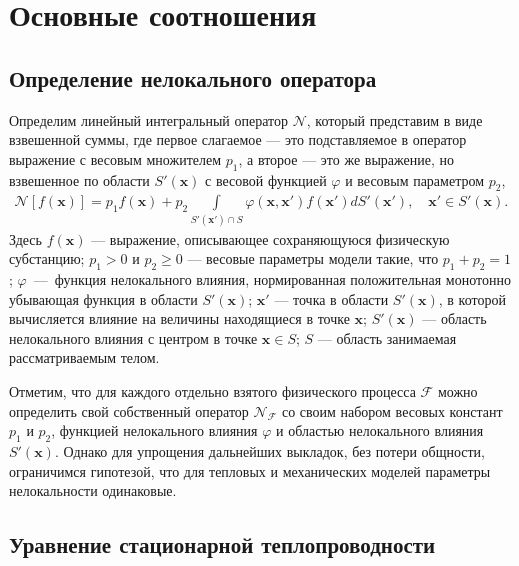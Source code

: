\chapter{Основные соотношения}\label{ch:BasicRelations} 

\section{Определение нелокального оператора}\label{sec:BasicRelations/NonlocalOperator}

Определим линейный интегральный оператор $\mathcal{N}$, который представим в виде взвешенной суммы, где первое слагаемое --- это подставляемое в оператор выражение с весовым множителем $p_1$, а второе --- это же выражение, но взвешенное по области $S'(\boldsymbol{x})$ с весовой функцией $\varphi$ и весовым параметром $p_2$,
\begin{gather}
	\label{eq:IntegroDiffOperator}
	\mathcal{N} [f(\boldsymbol{x})] = 
	p_1 f(\boldsymbol{x}) + 
	p_2 \int\limits_{S'(\boldsymbol{x}') \cap S} 
		\varphi(\boldsymbol{x}, \boldsymbol{x}') f(\boldsymbol{x}')
	dS'(\boldsymbol{x}'),
	\quad
	\boldsymbol{x}' \in S'(\boldsymbol{x}).
\end{gather}
Здесь $f(\boldsymbol{x})$ --- выражение, описывающее сохраняющуюся физическую субстанцию;
$p_1 > 0$ и $p_2 \geqslant 0$ --- весовые параметры модели такие, что $p_1 + p_2 = 1$;
$\varphi$~---~функция нелокального влияния, нормированная положительная монотонно убывающая функция в области $S'(\boldsymbol{x})$; 
$\boldsymbol{x}'$ --- точка в области $S'(\boldsymbol{x})$, в которой вычисляется влияние на величины находящиеся в точке $\boldsymbol{x}$;
$S'(\boldsymbol{x})$ --- область нелокального влияния с центром в точке $\boldsymbol{x} \in S$;
$S$ --- область занимаемая рассматриваемым телом.

Отметим, что для каждого отдельно взятого физического процесса $\mathcal{F}$ можно определить свой собственный оператор $\mathcal{N}_\mathcal{F}$ со своим набором весовых констант $p_1$ и $p_2$, функцией нелокального влияния $\varphi$ и областью нелокального влияния $S'(\boldsymbol{x})$. Однако для упрощения дальнейших выкладок, без потери общности, ограничимся гипотезой, что для тепловых и механических моделей параметры нелокальности одинаковые.

\section{Уравнение стационарной теплопроводности}\label{sec:BasicRelations/HeatEquation}

